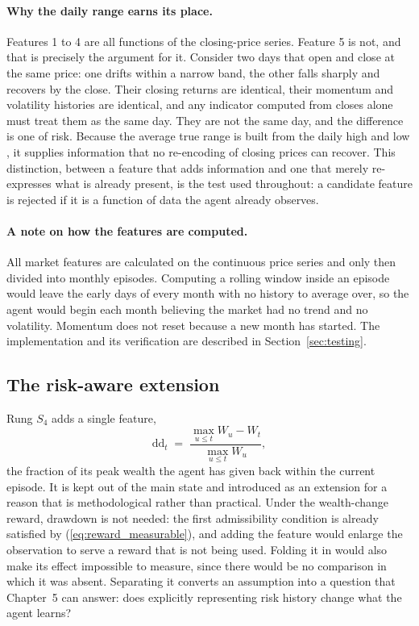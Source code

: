 \paragraph{Why the daily range earns its place.} Features 1 to 4 are all
functions of the closing-price series. Feature 5 is not, and that is
precisely the argument for it. Consider two days that open and close at
the same price: one drifts within a narrow band, the other falls sharply
and recovers by the close. Their closing returns are identical, their
momentum and volatility histories are identical, and any indicator
computed from closes alone must treat them as the same day. They are not
the same day, and the difference is one of risk. Because the average true
range is built from the daily high and low \cite{wilder1978}, it supplies
information that no re-encoding of closing prices can recover. This
distinction, between a feature that adds information and one that merely
re-expresses what is already present, is the test used throughout: a
candidate feature is rejected if it is a function of data the agent
already observes.

\paragraph{A note on how the features are computed.} All market features
are calculated on the continuous price series and only then divided into
monthly episodes. Computing a rolling window inside an episode would
leave the early days of every month with no history to average over, so
the agent would begin each month believing the market had no trend and no
volatility. Momentum does not reset because a new month has started. The
implementation and its verification are described in
Section~\ref{sec:testing}.

\subsection{The risk-aware extension}
\label{sec:risk_extension}

Rung $S_4$ adds a single feature,
\begin{equation}
\mathrm{dd}_t \;=\; \frac{\max_{u \le t} W_u - W_t}{\max_{u \le t} W_u},
\label{eq:drawdown}
\end{equation}
the fraction of its peak wealth the agent has given back within the
current episode. It is kept out of the main state and introduced as an
extension for a reason that is methodological rather than practical. Under
the wealth-change reward, drawdown is not needed: the first admissibility
condition is already satisfied by (\ref{eq:reward_measurable}), and adding
the feature would enlarge the observation to serve a reward that is not
being used. Folding it in would also make its effect impossible to
measure, since there would be no comparison in which it was absent.
Separating it converts an assumption into a question that Chapter~5 can
answer: does explicitly representing risk history change what the agent
learns?

